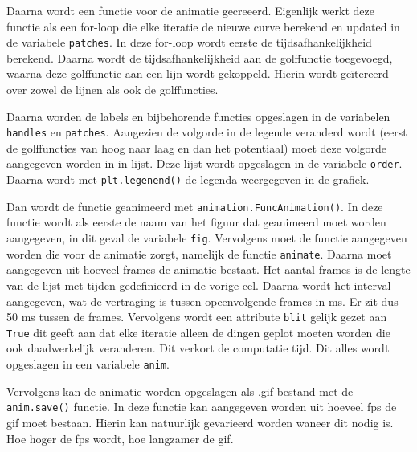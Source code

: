 \documentclass[11pt]{article}
\begin{document}
Daarna wordt een functie voor de animatie gecreeerd. Eigenlijk werkt
deze functie als een for-loop die elke iteratie de nieuwe curve berekend
en updated in de variabele \texttt{patches}. In deze for-loop wordt
eerste de tijdsafhankelijkheid berekend. Daarna wordt de
tijdsafhankelijkheid aan de golffunctie toegevoegd, waarna deze
golffunctie aan een lijn wordt gekoppeld. Hierin wordt geïtereerd over
zowel de lijnen als ook de golffuncties.

Daarna worden de labels en bijbehorende functies opgeslagen in de
variabelen \texttt{handles} en \texttt{patches}. Aangezien de volgorde
in de legende veranderd wordt (eerst de golffuncties van hoog naar laag
en dan het potentiaal) moet deze volgorde aangegeven worden in in lijst.
Deze lijst wordt opgeslagen in de variabele \texttt{order}. Daarna wordt
met \texttt{plt.legenend()} de legenda weergegeven in de grafiek.

Dan wordt de functie geanimeerd met \texttt{animation.FuncAnimation()}.
In deze functie wordt als eerste de naam van het figuur dat geanimeerd
moet worden aangegeven, in dit geval de variabele \texttt{fig}.
Vervolgens moet de functie aangegeven worden die voor de animatie zorgt,
namelijk de functie \texttt{animate}. Daarna moet aangegeven uit hoeveel
frames de animatie bestaat. Het aantal frames is de lengte van de lijst
met tijden gedefinieerd in de vorige cel. Daarna wordt het interval
aangegeven, wat de vertraging is tussen opeenvolgende frames in ms. Er
zit dus 50 ms tussen de frames. Vervolgens wordt een attribute
\texttt{blit} gelijk gezet aan \texttt{True} dit geeft aan dat elke
iteratie alleen de dingen geplot moeten worden die ook daadwerkelijk
veranderen. Dit verkort de computatie tijd. Dit alles wordt opgeslagen
in een variabele \texttt{anim}.

Vervolgens kan de animatie worden opgeslagen als .gif bestand met de
\texttt{anim.save()} functie. In deze functie kan aangegeven worden uit
hoeveel fps de gif moet bestaan. Hierin kan natuurlijk gevarieerd worden
waneer dit nodig is. Hoe hoger de fps wordt, hoe langzamer de gif.
\end{document}
